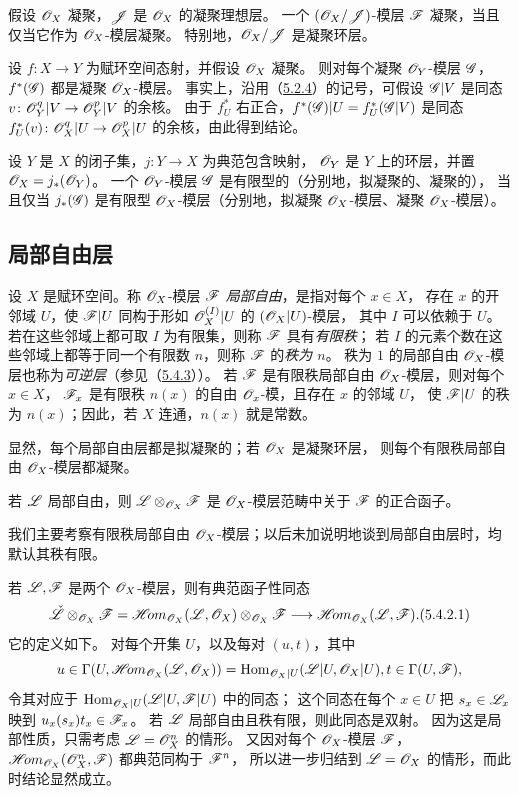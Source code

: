 假设 $\mathscr O_X$ 凝聚，$\mathscr J$ 是 $\mathscr O_X$ 的凝聚理想层。
一个 $(\mathscr O_X/\mathscr J)$-模层 $\mathscr F$ 凝聚，当且仅当它作为 $\mathscr O_X$-模层凝聚。
特别地，$\mathscr O_X/\mathscr J$ 是凝聚环层。

设 $f\colon X\to Y$ 为赋环空间态射，并假设 $\mathscr O_X$ 凝聚。
则对每个凝聚 $\mathscr O_Y$-模层 $\mathscr G$，$f^*(\mathscr G)$ 都是凝聚 $\mathscr O_X$-模层。
事实上，沿用（\hyperlink{para:0:5.2.4}{5.2.4}）的记号，可假设 $\mathscr G|V$ 是同态
$v\colon\mathscr O_Y^q|V\to\mathscr O_Y^p|V$ 的余核。
由于 $f_U^*$ 右正合，$f^*(\mathscr G)|U=f_U^*(\mathscr G|V)$ 是同态
$f_U^*(v)\colon\mathscr O_X^q|U\to\mathscr O_X^p|U$ 的余核，由此得到结论。

设 $Y$ 是 $X$ 的闭子集，$j\colon Y\to X$ 为典范包含映射，
$\mathscr O_Y$ 是 $Y$ 上的环层，并置 $\mathscr O_X=j_*(\mathscr O_Y)$。
一个 $\mathscr O_Y$-模层 $\mathscr G$ 是有限型的（分别地，拟凝聚的、凝聚的），
当且仅当 $j_*(\mathscr G)$ 是有限型 $\mathscr O_X$-模层（分别地，拟凝聚 $\mathscr O_X$-模层、凝聚 $\mathscr O_X$-模层）。

\subsection{局部自由层}\hypertarget{heading:0:5.4}{}

设 $X$ 是赋环空间。称 $\mathscr O_X$-模层 $\mathscr F$ \emph{局部自由}，是指对每个 $x\in X$，
存在 $x$ 的开邻域 $U$，使 $\mathscr F|U$ 同构于形如 $\mathscr O_X^{(I)}|U$ 的 $(\mathscr O_X|U)$-模层，
其中 $I$ 可以依赖于 $U$。
若在这些邻域上都可取 $I$ 为有限集，则称 $\mathscr F$ 具有\emph{有限秩}；
若 $I$ 的元素个数在这些邻域上都等于同一个有限数 $n$，则称 $\mathscr F$ 的\emph{秩为 $n$}。
秩为 $1$ 的局部自由 $\mathscr O_X$-模层也称为\emph{可逆层}（参见（\hyperlink{para:0:5.4.3}{5.4.3}））。
若 $\mathscr F$ 是有限秩局部自由 $\mathscr O_X$-模层，则对每个 $x\in X$，
$\mathscr F_x$ 是有限秩 $n(x)$ 的自由 $\mathscr O_x$-模，且存在 $x$ 的邻域 $U$，
使 $\mathscr F|U$ 的秩为 $n(x)$；因此，若 $X$ 连通，$n(x)$ 就是常数。

显然，每个局部自由层都是拟凝聚的；若 $\mathscr O_X$ 是凝聚环层，
则每个有限秩局部自由 $\mathscr O_X$-模层都凝聚。

若 $\mathscr L$ 局部自由，则 $\mathscr L\otimes_{\mathscr O_X}\mathscr F$ 是 $\mathscr O_X$-模层范畴中关于 $\mathscr F$ 的正合函子。

我们主要考察有限秩局部自由 $\mathscr O_X$-模层；以后未加说明地谈到局部自由层时，均默认其秩有限。

若 $\mathscr L,\mathscr F$ 是两个 $\mathscr O_X$-模层，则有典范函子性同态
\begin{equation}
 \dual{\LL}\otimes_{\OO_X}\F
 =\shHom_{\OO_X}(\LL,\OO_X)\otimes_{\OO_X}\F
 \longrightarrow\shHom_{\OO_X}(\LL,\F).
 \tag{5.4.2.1}\label{eq:0:5.4.2.1}
\end{equation}
它的定义如下。
对每个开集 $U$，以及每对 $(u,t)$，其中
\[
 u\in\Gamma(U,\mathscr{H}\!om_{\mathscr O_X}(\mathscr L,\mathscr O_X))
 =\operatorname{Hom}_{\mathscr O_X|U}(\mathscr L|U,\mathscr O_X|U),
  t\in\Gamma(U,\mathscr F),
\]
令其对应于 $\operatorname{Hom}_{\mathscr O_X|U}(\mathscr L|U,\mathscr F|U)$ 中的同态；
这个同态在每个 $x\in U$ 把 $s_x\in\mathscr L_x$ 映到 $u_x(s_x)t_x\in\mathscr F_x$。
若 $\mathscr L$ 局部自由且秩有限，则此同态是双射。
因为这是局部性质，只需考虑 $\mathscr L=\mathscr O_X^n$ 的情形。
又因对每个 $\mathscr O_X$-模层 $\mathscr F$，$\mathscr{H}\!om_{\mathscr O_X}(\mathscr O_X^n,\mathscr F)$ 都典范同构于 $\mathscr F^n$，
所以进一步归结到 $\mathscr L=\mathscr O_X$ 的情形，而此时结论显然成立。

